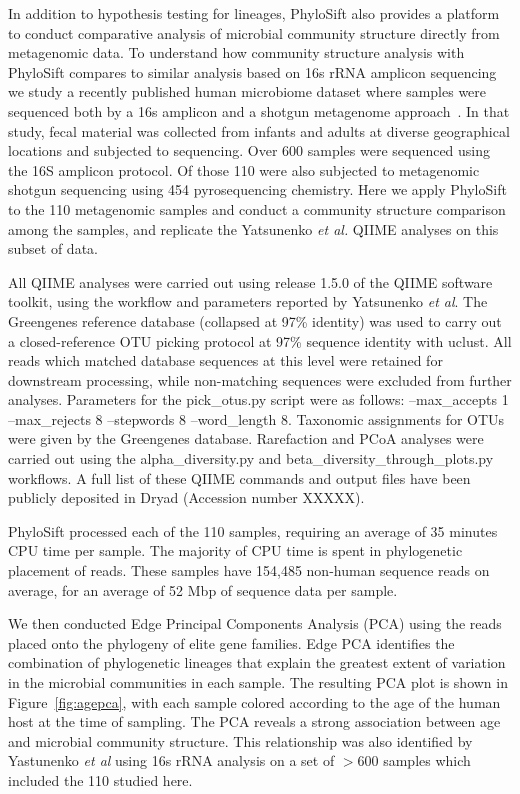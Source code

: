 \documentclass[10pt]{article}
\begin{document}
In addition to hypothesis testing for lineages, PhyloSift also provides a platform to conduct comparative analysis of microbial community structure directly from metagenomic data.
To understand how community structure analysis with PhyloSift compares to similar analysis based on 16s rRNA amplicon sequencing we study a recently published human microbiome dataset where samples were sequenced both by a 16s amplicon and a shotgun metagenome approach~\cite{Yatsunenko2012}.
In that study, fecal material was collected from infants and adults at diverse geographical locations and subjected to sequencing.
Over 600 samples were sequenced using the 16S amplicon protocol.
Of those 110 were also subjected to metagenomic shotgun sequencing using 454 pyrosequencing chemistry.
Here we apply PhyloSift to the 110 metagenomic samples and conduct a community structure comparison among the samples, and replicate the Yatsunenko \textit{et al.} QIIME analyses on this subset of data.

All QIIME analyses were carried out using release 1.5.0 of the QIIME software toolkit, using the workflow and parameters reported by Yatsunenko \textit{et al}. The Greengenes reference database (collapsed at 97\% identity) was used to carry out a closed-reference OTU picking protocol at 97\% sequence identity with uclust. All reads which matched database sequences at this level were retained for downstream processing, while non-matching sequences were excluded from further analyses. Parameters for the pick\_otus.py script were as follows: --max\_accepts 1 --max\_rejects 8 --stepwords 8 --word\_length 8. Taxonomic assignments for OTUs were given by the Greengenes database. Rarefaction and PCoA analyses were carried out using the alpha\_diversity.py and beta\_diversity\_through\_plots.py workflows. A full list of these QIIME commands and output files have been publicly deposited in Dryad (Accession number XXXXX).

PhyloSift processed each of the 110 samples, requiring an average of 35 minutes CPU time per sample.
The majority of CPU time is spent in phylogenetic placement of reads.
These samples have 154,485 non-human sequence reads on average, for an average of 52 Mbp of sequence data per sample.

We then conducted Edge Principal Components Analysis (PCA) using the reads placed onto the phylogeny of elite gene families.
Edge PCA identifies the combination of phylogenetic lineages that explain the greatest extent of variation in the microbial communities in each sample.
The resulting PCA plot is shown in Figure~\ref{fig:agepca}, with each sample colored according to the age of the human host at the time of sampling.
The PCA reveals a strong association between age and microbial community structure.
This relationship was also identified by Yastunenko \textit{et al} using 16s rRNA analysis on a set of $>$600 samples which included the 110 studied here.
\end{document}
